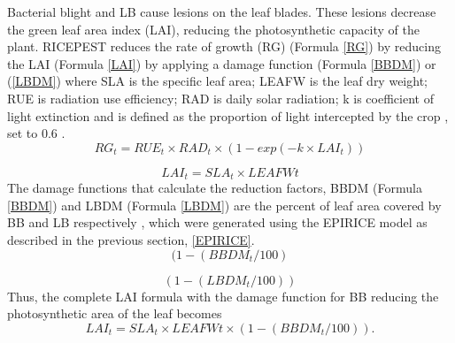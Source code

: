 \documentclass[preprint,review,12pt]{elsarticle}
\begin{document}
    Bacterial blight and LB cause lesions on the leaf blades. These lesions decrease the green leaf area index (LAI), reducing the photosynthetic capacity of the plant. RICEPEST reduces the rate of growth (RG) (Formula \ref{RG}) by reducing the LAI (Formula \ref{LAI}) by applying a damage function (Formula \ref{BBDM}) or (\ref{LBDM}) where SLA is the specific leaf area; LEAFW is the leaf dry weight; RUE is radiation use efficiency; RAD is daily solar radiation; k is coefficient of light extinction and is defined as the proportion of light intercepted by the crop \cite{Willocquet2000}, set to 0.6 \cite{Willocquet2002}.
    \begin{equation}
    RG_t = RUE_t \times RAD_t \times (1- exp(- k \times LAI_t))
    \label{RG}
    \end{equation}
    
    \begin{equation}
    LAI_t = SLA_t \times LEAFWt
    \label{LAI}
    \end{equation}
    The damage functions that calculate the reduction factors, BBDM (Formula \ref{BBDM}) and LBDM (Formula \ref{LBDM}) are the percent of leaf area covered by BB and LB respectively \cite{Willocquet2002}, which were generated using the EPIRICE model as described in the previous section, \ref{EPIRICE}. 
    \begin{equation}
    (1-(BBDM_t /100)
    \label{BBDM}
    \end{equation}
    
    \begin{equation}
    (1-(LBDM_t /100))
    \label{LBDM}
    \end{equation}
    Thus, the complete LAI formula with the damage function for BB reducing the photosynthetic area of the leaf becomes
     \begin{equation}
    LAI_t = SLA_t \times LEAFWt \times (1-(BBDM_t / 100)).
    \label{LAIBBDM}
    \end{equation}
    
\end{document}
